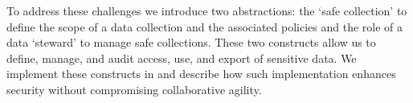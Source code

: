 To address these challenges we introduce two abstractions:
the `safe collection' to define the scope of a data collection
and the associated policies and the role of a data `steward'
to manage safe collections. These two constructs allow us
to define, manage, and audit access, use, and export of
sensitive data.  We implement these constructs in \NAME and
describe how such implementation enhances security without compromising collaborative agility.


%
